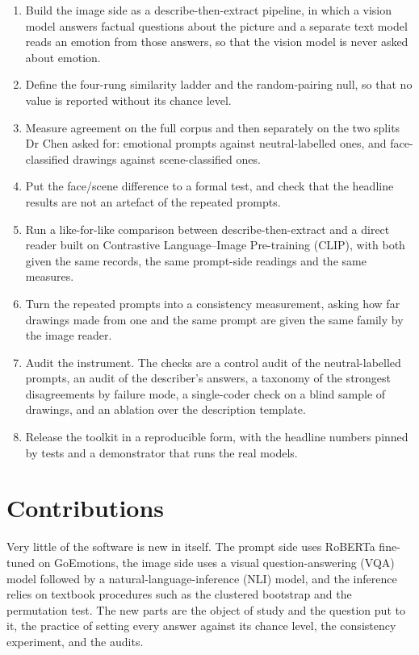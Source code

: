 \begin{enumerate}
\item Build the image side as a describe-then-extract pipeline, in which a vision model answers factual questions about the picture and a separate text model reads an emotion from those answers, so that the vision model is never asked about emotion.
\item Define the four-rung similarity ladder and the random-pairing null, so that no value is reported without its chance level.
\item Measure agreement on the full corpus and then separately on the two splits Dr Chen asked for: emotional prompts against neutral-labelled ones, and face-classified drawings against scene-classified ones.
\item Put the face/scene difference to a formal test, and check that the headline results are not an artefact of the repeated prompts.
\item Run a like-for-like comparison between describe-then-extract and a direct reader built on Contrastive Language--Image Pre-training (CLIP), with both given the same records, the same prompt-side readings and the same measures.
\item Turn the repeated prompts into a consistency measurement, asking how far drawings made from one and the same prompt are given the same family by the image reader.
\item Audit the instrument. The checks are a control audit of the neutral-labelled prompts, an audit of the describer's answers, a taxonomy of the strongest disagreements by failure mode, a single-coder check on a blind sample of drawings, and an ablation over the description template.
\item Release the toolkit in a reproducible form, with the headline numbers pinned by tests and a demonstrator that runs the real models.
\end{enumerate}

\section{Contributions}
\label{sec:intro-contributions}

Very little of the software is new in itself. The prompt side uses RoBERTa fine-tuned on GoEmotions, the image side uses a visual question-answering (VQA) model followed by a natural-language-inference (NLI) model, and the inference relies on textbook procedures such as the clustered bootstrap and the permutation test. The new parts are the object of study and the question put to it, the practice of setting every answer against its chance level, the consistency experiment, and the audits.


